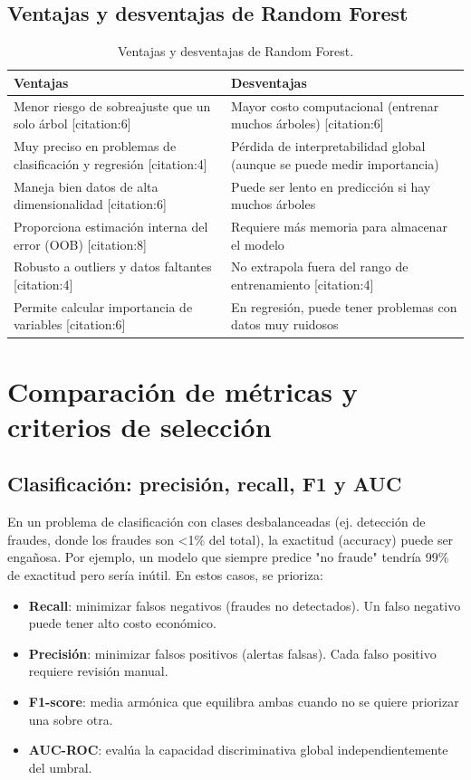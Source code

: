 \documentclass[12pt,a4paper,openany,oneside]{book}
\begin{document}
\subsection{Ventajas y desventajas de Random Forest}
\begin{table}[h]
\centering
\begin{tabular}{|p{5cm}|p{5cm}|}
\hline
\textbf{Ventajas} & \textbf{Desventajas} \\
\hline
Menor riesgo de sobreajuste que un solo árbol [citation:6] & Mayor costo computacional (entrenar muchos árboles) [citation:6] \\
Muy preciso en problemas de clasificación y regresión [citation:4] & Pérdida de interpretabilidad global (aunque se puede medir importancia) \\
Maneja bien datos de alta dimensionalidad [citation:6] & Puede ser lento en predicción si hay muchos árboles \\
Proporciona estimación interna del error (OOB) [citation:8] & Requiere más memoria para almacenar el modelo \\
Robusto a outliers y datos faltantes [citation:4] & No extrapola fuera del rango de entrenamiento [citation:4] \\
Permite calcular importancia de variables [citation:6] & En regresión, puede tener problemas con datos muy ruidosos \\
\hline
\end{tabular}
\caption{Ventajas y desventajas de Random Forest.}
\end{table}

\section{Comparación de métricas y criterios de selección}

\subsection{Clasificación: precisión, recall, F1 y AUC}
En un problema de clasificación con clases desbalanceadas (ej. detección de fraudes, donde los fraudes son <1\% del total), la exactitud (accuracy) puede ser engañosa. Por ejemplo, un modelo que siempre predice "no fraude" tendría 99\% de exactitud pero sería inútil. En estos casos, se prioriza:

\begin{itemize}
    \item \textbf{Recall}: minimizar falsos negativos (fraudes no detectados). Un falso negativo puede tener alto costo económico.
    \item \textbf{Precisión}: minimizar falsos positivos (alertas falsas). Cada falso positivo requiere revisión manual.
    \item \textbf{F1-score}: media armónica que equilibra ambas cuando no se quiere priorizar una sobre otra.
    \item \textbf{AUC-ROC}: evalúa la capacidad discriminativa global independientemente del umbral.
\end{itemize}
\end{document}

